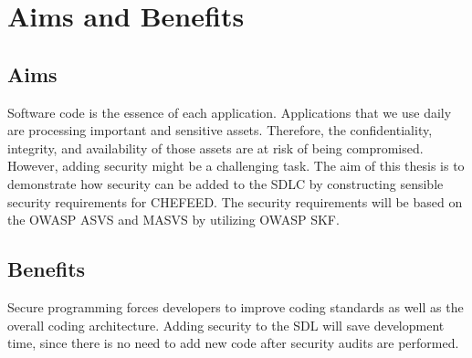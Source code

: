 \section{Aims and Benefits}

\subsection{Aims}
Software code is the essence of each application. Applications that we use daily are processing important and sensitive assets. Therefore, the confidentiality, integrity, and availability of those assets are at risk of being compromised. However, adding security might be a challenging task. The aim of this thesis is to demonstrate how security can be added to the SDLC by constructing sensible security requirements for CHEFEED. The security requirements will be based on the OWASP ASVS and MASVS by utilizing OWASP SKF.

\subsection{Benefits}
Secure programming forces developers to improve coding standards as well as the overall coding architecture. Adding security to the SDL will save development time, since there is no need to add new code after security audits are performed.
